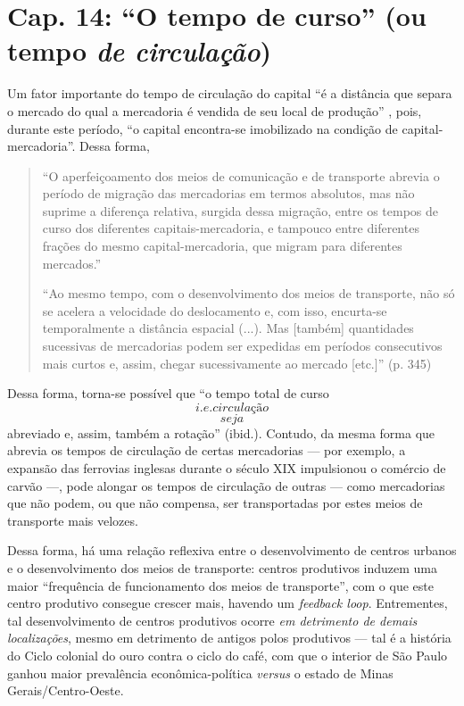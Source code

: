 \section{Cap. 14: ``O tempo de curso'' (ou tempo \textit{de circulação})}
Um fator importante do tempo de circulação do capital ``é a distância que separa o mercado do qual a mercadoria é vendida de seu local de produção'' \parencite[p. 344]{Marx2014}, pois, durante este período, ``o capital encontra-se imobilizado na condição de capital-mercadoria''. Dessa forma,
\begin{quote}
``O aperfeiçoamento dos meios de comunicação e de transporte abrevia o período de migração das mercadorias em termos absolutos, mas não suprime a diferença relativa, surgida dessa migração, entre os tempos de curso dos diferentes capitais-mercadoria, e tampouco entre diferentes frações do mesmo capital-mercadoria, que migram para diferentes mercados.'' \parencite[p. 344]{Marx2014}

``Ao mesmo tempo, com o desenvolvimento dos meios de transporte, não só se acelera a velocidade do deslocamento e, com isso, encurta-se temporalmente a distância espacial (...). Mas [também] quantidades sucessivas de mercadorias podem ser expedidas em períodos consecutivos mais curtos e, assim, chegar sucessivamente ao mercado [etc.]'' (p. 345)
\end{quote}

Dessa forma, torna-se possível que ``o tempo total de curso \[i.e. circulação\] \[seja\] abreviado e, assim, também a rotação'' (ibid.). Contudo, da mesma forma que abrevia os tempos de circulação de certas mercadorias — por exemplo, a expansão das ferrovias inglesas durante o século XIX impulsionou o comércio de carvão —, pode alongar os tempos de circulação de outras — como mercadorias que não podem, ou que não compensa, ser transportadas por estes meios de transporte mais velozes. 

Dessa forma, há uma relação reflexiva entre o desenvolvimento de centros urbanos e o desenvolvimento dos meios de transporte: centros produtivos induzem uma maior ``frequência de funcionamento dos meios de transporte'', com o que este centro produtivo consegue crescer mais, havendo um \textit{feedback loop}. Entrementes, tal desenvolvimento de centros produtivos ocorre \textit{em detrimento de demais localizações}, mesmo em detrimento de antigos polos produtivos — tal é a história do Ciclo colonial do ouro contra o ciclo do café, com que o interior de São Paulo ganhou maior prevalência econômica-política \textit{versus} o estado de Minas Gerais/Centro-Oeste.


